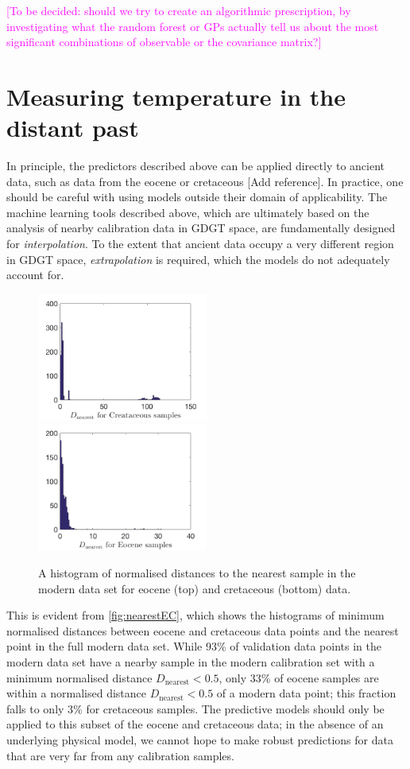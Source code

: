 \documentclass[rmp,aps,twocolumn]{revtex4-1}
\newcommand{\citeme}{{\color{blue} [Add reference]}}
\newcommand{\ilya}[1]{\textcolor{magenta}{#1}}
\begin{document}
\ilya{[To be decided: should we try to create an algorithmic prescription, by investigating what the random forest or GPs actually tell us about the most significant combinations of observable or the covariance matrix?]} 


\section{Measuring temperature in the distant past}

In principle, the predictors described above can be applied directly to ancient data, such as data from the eocene or cretaceous \citeme.  In practice, one should be careful with using models outside their domain of applicability.  The machine learning tools described above, which are ultimately based on the analysis of nearby calibration data in GDGT space, are fundamentally designed for {\it interpolation}.  To the extent that ancient data occupy a very different region in GDGT space, {\it extrapolation} is required, which the models do not adequately account for.

\begin{figure}
	\centering
	\includegraphics[width=0.5\textwidth]{nearestE.png}
	\includegraphics[width=0.5\textwidth]{nearestC.png}
	\caption{\label{fig:nearestEC}  A histogram of normalised distances to the nearest sample in the modern data set for eocene (top) and cretaceous (bottom) data.}
\end{figure}

This is evident from \autoref{fig:nearestEC}, which shows the histograms of minimum normalised distances between eocene and cretaceous data points and the nearest point in the full modern data set.  While 93\% of validation data points in the modern data set have a nearby sample in the modern calibration set with a minimum normalised distance $D_\textrm{nearest}<0.5$, only 33\% of eocene samples are within a normalised distance $D_\textrm{nearest}<0.5$ of a modern data point; this fraction falls to only 3\% for cretaceous samples.  The predictive models should only be applied to this subset of the eocene and cretaceous data; in the absence of an underlying physical model, we cannot hope to make robust predictions for data that are very far from any calibration samples.
\end{document}
